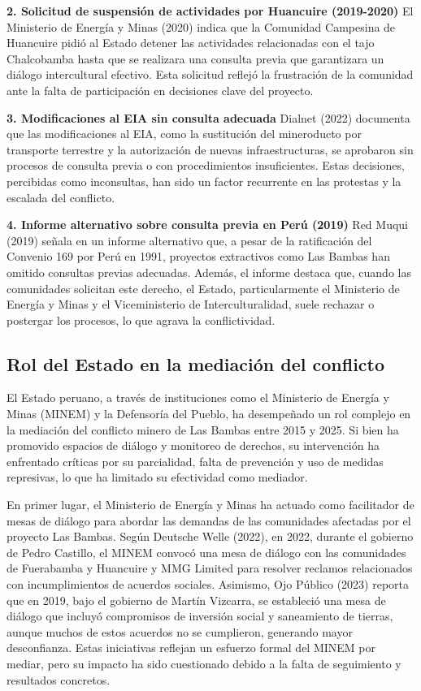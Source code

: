 \documentclass[
  stu,
  floatsintext,
  longtable,
  a4paper,
  nolmodern,
  notxfonts,
  notimes,
  colorlinks=true,linkcolor=blue,citecolor=blue,urlcolor=blue]{apa7}
\begin{document}
\textbf{2. Solicitud de suspensión de actividades por Huancuire
(2019-2020)} El Ministerio de Energía y Minas (2020) indica que la
Comunidad Campesina de Huancuire pidió al Estado detener las actividades
relacionadas con el tajo Chalcobamba hasta que se realizara una consulta
previa que garantizara un diálogo intercultural efectivo. Esta solicitud
reflejó la frustración de la comunidad ante la falta de participación en
decisiones clave del proyecto.

\textbf{3. Modificaciones al EIA sin consulta adecuada} Dialnet (2022)
documenta que las modificaciones al EIA, como la sustitución del
mineroducto por transporte terrestre y la autorización de nuevas
infraestructuras, se aprobaron sin procesos de consulta previa o con
procedimientos insuficientes. Estas decisiones, percibidas como
inconsultas, han sido un factor recurrente en las protestas y la
escalada del conflicto.

\textbf{4. Informe alternativo sobre consulta previa en Perú (2019)} Red
Muqui (2019) señala en un informe alternativo que, a pesar de la
ratificación del Convenio 169 por Perú en 1991, proyectos extractivos
como Las Bambas han omitido consultas previas adecuadas. Además, el
informe destaca que, cuando las comunidades solicitan este derecho, el
Estado, particularmente el Ministerio de Energía y Minas y el
Viceministerio de Interculturalidad, suele rechazar o postergar los
procesos, lo que agrava la conflictividad.

\subsection{Rol del Estado en la mediación del
conflicto}\label{rol-del-estado-en-la-mediaciuxf3n-del-conflicto}

El Estado peruano, a través de instituciones como el Ministerio de
Energía y Minas (MINEM) y la Defensoría del Pueblo, ha desempeñado un
rol complejo en la mediación del conflicto minero de Las Bambas entre
2015 y 2025. Si bien ha promovido espacios de diálogo y monitoreo de
derechos, su intervención ha enfrentado críticas por su parcialidad,
falta de prevención y uso de medidas represivas, lo que ha limitado su
efectividad como mediador.

En primer lugar, el Ministerio de Energía y Minas ha actuado como
facilitador de mesas de diálogo para abordar las demandas de las
comunidades afectadas por el proyecto Las Bambas. Según Deutsche Welle
(2022), en 2022, durante el gobierno de Pedro Castillo, el MINEM convocó
una mesa de diálogo con las comunidades de Fuerabamba y Huancuire y MMG
Limited para resolver reclamos relacionados con incumplimientos de
acuerdos sociales. Asimismo, Ojo Público (2023) reporta que en 2019,
bajo el gobierno de Martín Vizcarra, se estableció una mesa de diálogo
que incluyó compromisos de inversión social y saneamiento de tierras,
aunque muchos de estos acuerdos no se cumplieron, generando mayor
desconfianza. Estas iniciativas reflejan un esfuerzo formal del MINEM
por mediar, pero su impacto ha sido cuestionado debido a la falta de
seguimiento y resultados concretos.
\end{document}
